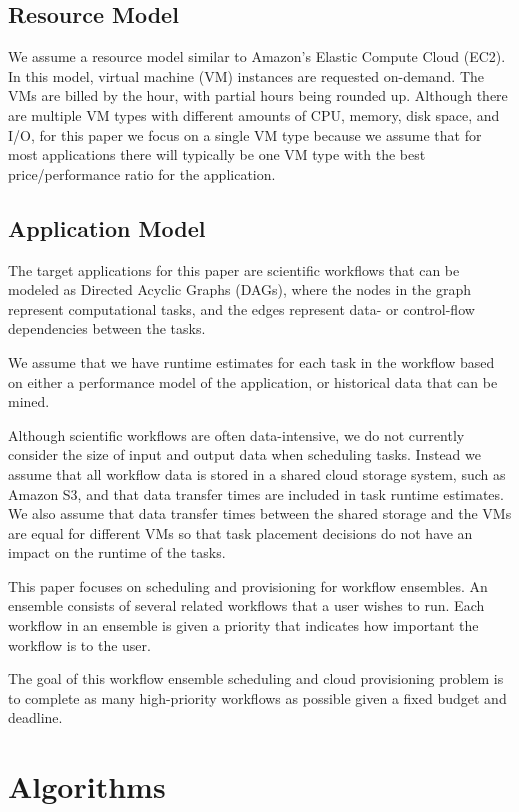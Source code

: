 \documentclass{sig-alternate}
\begin{document}
\subsection{Resource Model}

We assume a resource model similar to Amazon's Elastic Compute Cloud (EC2). In this model, virtual machine (VM) instances are requested on-demand. The VMs are billed by the hour, with partial hours being rounded up. Although there are multiple VM types with different amounts of CPU, memory, disk space, and I/O, for this paper we focus on a single VM type because we assume that for most applications there will typically be one VM type with the best price/performance ratio for the application.

\subsection{Application Model}
The target applications for this paper are scientific workflows that can be modeled as Directed Acyclic Graphs (DAGs), where the nodes in the graph represent computational tasks, and the edges represent data- or control-flow dependencies between the tasks.

We assume that we have runtime estimates for each task in the workflow based on either a performance model of the application, or historical data that can be mined.

Although scientific workflows are often data-intensive, we do not currently consider the size of input and output data when scheduling tasks. Instead we assume that all workflow data is stored in a shared cloud storage system, such as Amazon S3, and that data transfer times are included in task runtime estimates. We also assume that data transfer times between the shared storage and the VMs are equal for different VMs so that task placement decisions do not have an impact on the runtime of the tasks.

This paper focuses on scheduling and provisioning for workflow ensembles. An ensemble consists of several related workflows that a user wishes to run. Each workflow in an ensemble is given a priority that indicates how important the workflow is to the user.

The goal of this workflow ensemble scheduling and cloud provisioning problem is to complete as many high-priority workflows as possible given a fixed budget and deadline.

\section{Algorithms}
\label{sec:algorithms}
\end{document}
